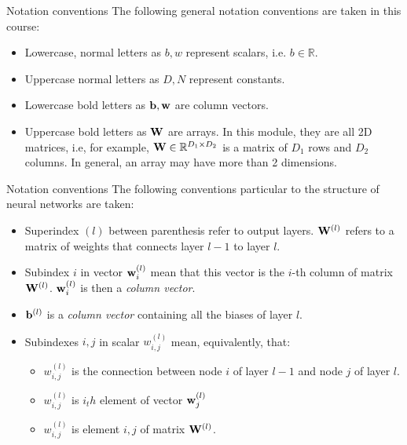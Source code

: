 \documentclass{beamer}
\begin{document}
\begin{frame}{Notation conventions}
    The following general notation conventions are taken in this course:
    \begin{itemize}
        \item Lowercase, normal letters as $b, w$ represent scalars, i.e. $b \in \mathbb{R}$.
        \item Uppercase normal letters as $D, N$ represent constants. 
        \item Lowercase bold letters as ${\bf b}, {\bf w}$ are column vectors. 
        \item Uppercase bold letters as ${\bf W}$ are arrays. In this module, they are all 2D matrices, i.e, for example, ${\bf W} \in \mathbb{R}^{D_1\times D_2}$ is a matrix of $D_1$ rows and $D_2$ columns. In general, an array may have more than 2 dimensions. 
    \end{itemize}
\end{frame}

\begin{frame}{Notation conventions}
The following conventions particular to the structure of neural networks are taken:
\begin{itemize}
    \item Superindex $(l)$ between parenthesis refer to output layers. ${\bf W}^{(l)}$ refers to a matrix of weights that connects layer $l-1$ to layer $l$.
    \item Subindex $i$ in vector ${\bf w}_i^{(l)}$ mean that this vector is the $i$-th column of matrix ${\bf W}^{(l)}$. ${\bf w}_i^{(l)}$ is then a \emph{column vector}.
    \item ${\bf b}^{(l)}$ is a \emph{column vector} containing all the biases of layer $l$.
    \item Subindexes $i,j$ in scalar $w^{(l)}_{i,j}$ mean, equivalently, that:
    \begin{itemize}
        \item $w^{(l)}_{i,j}$ is the connection between node $i$ of layer $l-1$ and node $j$ of layer $l$.
        \item $w^{(l)}_{i,j}$ is $i_th$ element of vector ${\bf w}^{(l)}_j$
        \item $w^{(l)}_{i,j}$ is element ${i,j}$ of matrix ${\bf W}^{(l)}$.
        
    \end{itemize}    
\end{itemize}
    
\end{frame}
\end{document}
